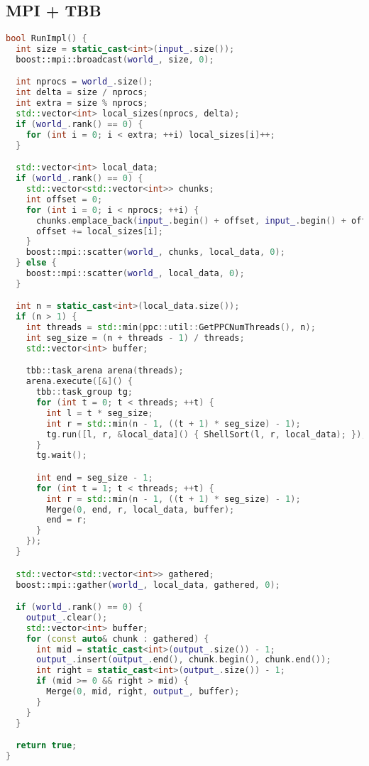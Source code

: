 \documentclass[a4paper,12pt]{article}
\begin{document}
\subsection{MPI + TBB}
\begin{lstlisting}[language=C++]
bool RunImpl() {
  int size = static_cast<int>(input_.size());
  boost::mpi::broadcast(world_, size, 0);

  int nprocs = world_.size();
  int delta = size / nprocs;
  int extra = size % nprocs;
  std::vector<int> local_sizes(nprocs, delta);
  if (world_.rank() == 0) {
    for (int i = 0; i < extra; ++i) local_sizes[i]++;
  }

  std::vector<int> local_data;
  if (world_.rank() == 0) {
    std::vector<std::vector<int>> chunks;
    int offset = 0;
    for (int i = 0; i < nprocs; ++i) {
      chunks.emplace_back(input_.begin() + offset, input_.begin() + offset + local_sizes[i]);
      offset += local_sizes[i];
    }
    boost::mpi::scatter(world_, chunks, local_data, 0);
  } else {
    boost::mpi::scatter(world_, local_data, 0);
  }

  int n = static_cast<int>(local_data.size());
  if (n > 1) {
    int threads = std::min(ppc::util::GetPPCNumThreads(), n);
    int seg_size = (n + threads - 1) / threads;
    std::vector<int> buffer;

    tbb::task_arena arena(threads);
    arena.execute([&]() {
      tbb::task_group tg;
      for (int t = 0; t < threads; ++t) {
        int l = t * seg_size;
        int r = std::min(n - 1, ((t + 1) * seg_size) - 1);
        tg.run([l, r, &local_data]() { ShellSort(l, r, local_data); });
      }
      tg.wait();

      int end = seg_size - 1;
      for (int t = 1; t < threads; ++t) {
        int r = std::min(n - 1, ((t + 1) * seg_size) - 1);
        Merge(0, end, r, local_data, buffer);
        end = r;
      }
    });
  }

  std::vector<std::vector<int>> gathered;
  boost::mpi::gather(world_, local_data, gathered, 0);

  if (world_.rank() == 0) {
    output_.clear();
    std::vector<int> buffer;
    for (const auto& chunk : gathered) {
      int mid = static_cast<int>(output_.size()) - 1;
      output_.insert(output_.end(), chunk.begin(), chunk.end());
      int right = static_cast<int>(output_.size()) - 1;
      if (mid >= 0 && right > mid) {
        Merge(0, mid, right, output_, buffer);
      }
    }
  }

  return true;
}
\end{lstlisting}
\end{document}
